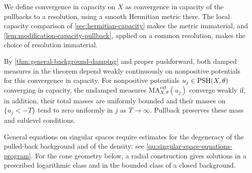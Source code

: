 We define convergence in capacity on $X$\label{sec:space-capacity-convergence} as convergence in capacity of the pullbacks to a resolution, using a smooth Hermitian metric there. The local capacity comparison of \cref{sec:hermitian-capacity} makes the metric immaterial, and \cref{lem:modification-capacity-pullback}, applied on a common resolution, makes the choice of resolution immaterial.

By \cref{thm:general-background-damping} and proper pushforward, both damped measures in the theorem depend weakly continuously on nonpositive potentials for this convergence in capacity. For nonpositive potentials $u_j\in\mathrm{PSH}(X,\theta)$ converging in capacity, the undamped measures $\mathrm{MA}^{\mathrm{ext}}_{X,\theta}(u_j)$ converge weakly if, in addition, their total masses are uniformly bounded and their masses on $\{u_j<-T\}$ tend to zero uniformly in $j$ as $T\to\infty$. Pullback preserves these mass and sublevel conditions.

General equations on singular spaces require estimates for the degeneracy of the pulled-back background and of the density; see \cref{qu:singular-space-equations-program}. For the cone geometry below, a radial construction gives solutions in a prescribed logarithmic class and in the bounded class of a closed background.






\endgroup
